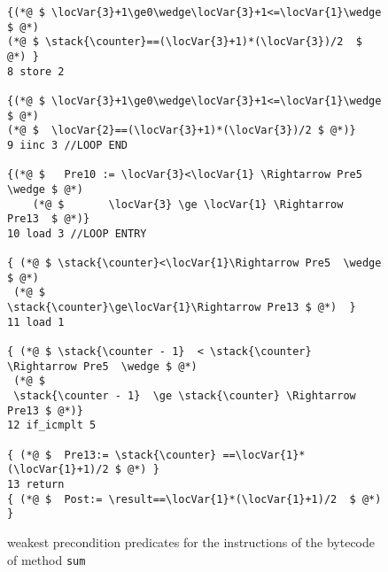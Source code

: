\begin{figure}
{\begin{lstlisting}[frame=trbl]
{(*@ $ \locVar{3}+1\ge0\wedge\locVar{3}+1<=\locVar{1}\wedge  $ @*)
(*@ $ \stack{\counter}==(\locVar{3}+1)*(\locVar{3})/2  $ @*) }
8 store 2

{(*@ $ \locVar{3}+1\ge0\wedge\locVar{3}+1<=\locVar{1}\wedge $ @*)
(*@ $  \locVar{2}==(\locVar{3}+1)*(\locVar{3})/2 $ @*)}
9 iinc 3 //LOOP END

{(*@ $   Pre10 := \locVar{3}<\locVar{1} \Rightarrow Pre5 \wedge $ @*)
    (*@ $       \locVar{3} \ge \locVar{1} \Rightarrow  Pre13  $ @*)}
10 load 3 //LOOP ENTRY

{ (*@ $ \stack{\counter}<\locVar{1}\Rightarrow Pre5  \wedge $ @*)
 (*@ $  
\stack{\counter}\ge\locVar{1}\Rightarrow Pre13 $ @*)  }
11 load 1

{ (*@ $ \stack{\counter - 1}  < \stack{\counter} \Rightarrow Pre5  \wedge $ @*)
 (*@ $ 
 \stack{\counter - 1}  \ge \stack{\counter} \Rightarrow  Pre13 $ @*)}
12 if_icmplt 5 

{ (*@ $  Pre13:= \stack{\counter} ==\locVar{1}*(\locVar{1}+1)/2 $ @*) }
13 return
{ (*@ $  Post:= \result==\locVar{1}*(\locVar{1}+1)/2  $ @*) }
\end{lstlisting} }
\caption{\sc weakest precondition predicates for the instructions of the   bytecode of method \lstinline!sum!}
\label{wp:example:sumVC}
\end{figure}







